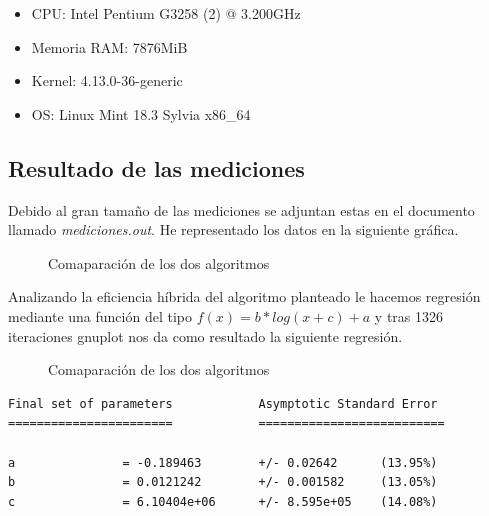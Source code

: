 \documentclass{article}
\begin{document}
\begin{itemize}
\item CPU: Intel Pentium G3258 (2) @ 3.200GHz
\item Memoria RAM: 7876MiB
\item Kernel: 4.13.0-36-generic
\item OS: Linux Mint 18.3 Sylvia x86\_64
\end{itemize}

\subsection{Resultado de las mediciones}

Debido al gran tamaño de las mediciones se adjuntan estas en el
documento llamado \textit{mediciones.out}. He representado los datos
en la siguiente gráfica.

\begin{figure}[H]
  \centering   

\caption{Comaparación de los dos algoritmos}
\end{figure}

Analizando la eficiencia híbrida del algoritmo planteado le hacemos
regresión mediante una función del tipo $f(x) = b*log(x+c)+a$ y tras
1326 iteraciones gnuplot nos da como resultado la siguiente regresión.

\begin{figure}[H]
  \centering   

\caption{Comaparación de los dos algoritmos}
\end{figure}

\begin{verbatim}
Final set of parameters            Asymptotic Standard Error
=======================            ==========================

a               = -0.189463        +/- 0.02642      (13.95%)
b               = 0.0121242        +/- 0.001582     (13.05%)
c               = 6.10404e+06      +/- 8.595e+05    (14.08%)
\end{verbatim}
\end{document}
